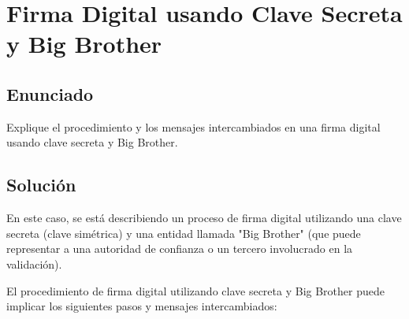 \documentclass[12pt]{article}
\begin{document}
\section{Firma Digital usando Clave Secreta y Big Brother}

\subsection{Enunciado}

Explique el procedimiento y los mensajes intercambiados en una firma digital usando clave secreta y Big Brother.

\subsection{Solución}

En este caso, se está describiendo un proceso de firma digital utilizando una clave secreta (clave simétrica) y una entidad llamada "Big Brother" (que puede representar a una autoridad de confianza o un tercero involucrado en la validación).

El procedimiento de firma digital utilizando clave secreta y Big Brother puede implicar los siguientes pasos y mensajes intercambiados:
\end{document}
